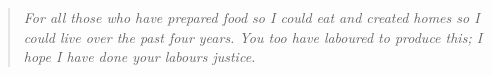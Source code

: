 
\begin{quotation}
\textit{For all those who have prepared food so I could eat and created homes so
  I could live over the past four years. You too have laboured to produce this; I
hope I have done your labours justice.}
\end{quotation}

